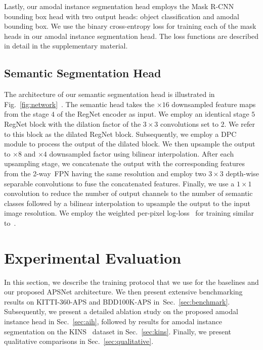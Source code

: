 \documentclass[10pt,twocolumn,letterpaper]{article}
\newcommand{\secref}[1]{Sec.~\ref{#1}}
\newcommand{\figref}[1]{Fig.~\ref{#1}}
\begin{document}
Lastly, our amodal instance segmentation head employs the Mask R-CNN bounding box head with two output heads: object classification and amodal bounding box. We use the binary cross-entropy loss for training each of the mask heads in our amodal instance segmentation head. The loss functions are described in detail in the supplementary material.

\subsection{Semantic Segmentation Head}

The architecture of our semantic segmentation head is illustrated in \figref{fig:network}~. The semantic head takes the $\times16$ downsampled feature maps from the stage $4$ of the RegNet encoder as input. We employ an identical stage $5$ RegNet block with the dilation factor of the $3\times3$ convolutions set to $2$. We refer to this block as the dilated RegNet block. Subsequently, we employ a DPC~\cite{chen2018searching} module to process the output of the dilated block. We then upsample the output to $\times8$ and $\times4$ downsampled factor using bilinear interpolation. After each upsampling stage, we concatenate the output with the corresponding features from the \mbox{2-way FPN} having the same resolution and employ two $3\times3$ depth-wise separable convolutions to fuse the concatenated features. Finally, we use a $1\times1$ convolution to reduce the number of output channels to the number of semantic classes followed by a bilinear interpolation to upsample the output to the input image resolution. We employ the weighted per-pixel log-loss~\cite{bulo2017loss} for training similar to~\cite{mohan2020efficientps}.
  
\section{Experimental Evaluation}
In this section, we describe the training protocol that we use for the baselines and our proposed \mbox{APSNet} architecture. We then present extensive benchmarking results on KITTI-360-APS and BDD100K-APS in~\secref{sec:benchmark}. Subsequently, we present a detailed ablation study on the proposed amodal instance head in \secref{sec:aih}, followed by results for amodal instance segmentation on the KINS~\cite{qi2019amodal} dataset in \secref{sec:kins}. Finally, we present qualitative comparisons in \secref{sec:qualitative}.
\end{document}
